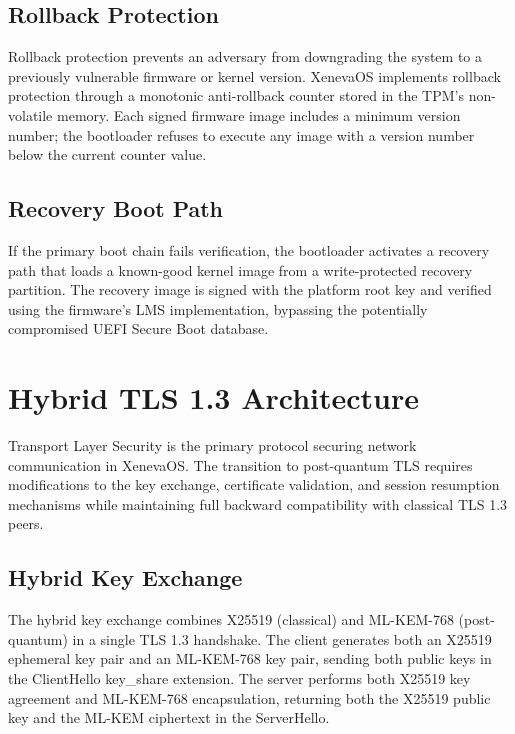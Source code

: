 \documentclass[11pt, a4paper]{article}
\begin{document}
\subsection{Rollback Protection}\label{sec:rollback}

Rollback protection prevents an adversary from downgrading the system to a previously vulnerable firmware or kernel version. XenevaOS implements rollback protection through a monotonic anti-rollback counter stored in the TPM's non-volatile memory. Each signed firmware image includes a minimum version number; the bootloader refuses to execute any image with a version number below the current counter value.

\subsection{Recovery Boot Path}\label{sec:recovery}

If the primary boot chain fails verification, the bootloader activates a recovery path that loads a known-good kernel image from a write-protected recovery partition. The recovery image is signed with the platform root key and verified using the firmware's LMS implementation, bypassing the potentially compromised UEFI Secure Boot database.



\section{Hybrid TLS 1.3 Architecture}\label{sec:hybrid-tls}

Transport Layer Security is the primary protocol securing network communication in XenevaOS. The transition to post-quantum TLS requires modifications to the key exchange, certificate validation, and session resumption mechanisms while maintaining full backward compatibility with classical TLS 1.3 peers.

\subsection{Hybrid Key Exchange}\label{sec:hybrid-kex}

The hybrid key exchange combines X25519 (classical) and ML-KEM-768 (post-quantum) in a single TLS 1.3 handshake. The client generates both an X25519 ephemeral key pair and an ML-KEM-768 key pair, sending both public keys in the ClientHello key\_share extension. The server performs both X25519 key agreement and ML-KEM-768 encapsulation, returning both the X25519 public key and the ML-KEM ciphertext in the ServerHello.
\end{document}

